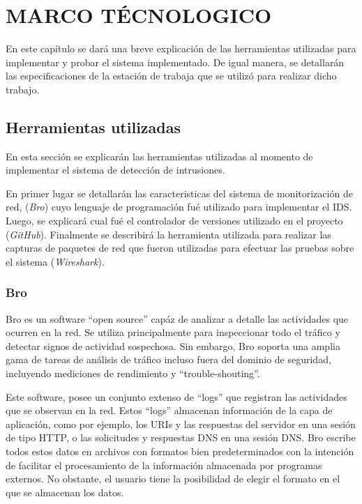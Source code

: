 \chapter{MARCO TÉCNOLOGICO}
\label{capituloTecnologico}

En este capítulo se dará una breve explicación de las herramientas utilizadas para implementar y probar el sistema implementado. De igual manera, se detallarán las especificaciones de la estación de trabaja que se utilizó para realizar dicho trabajo.  

\section{Herramientas utilizadas}

En esta sección se explicarán las herramientas utilizadas al momento de implementar el sistema  de detección de intrusiones.

En primer lugar se detallarán las caracteristicas del sistema de monitorización de red, (\textit{Bro}) cuyo lenguaje de programación fué utilizado para implementar el IDS. Luego, se explicará cual fué el controlador de versiones utilizado en el proyecto (\textit{GitHub}). Finalmente se describirá la herramienta utilizada para realizar las capturas de paquetes de red que fueron utilizadas para efectuar las pruebas sobre el sistema (\textit{Wireshark}).  

\subsection{Bro}\label{ssec:Bro}

Bro es un software ``open source'' capáz de analizar a detalle las actividades que ocurren en la red. Se utiliza principalmente para inspeccionar todo el tráfico y detectar signos de actividad sospechosa. Sin embargo, Bro soporta una amplia gama de tareas de análisis de tráfico incluso fuera del dominio de seguridad, incluyendo mediciones de rendimiento y ``trouble-shouting''.\cite{Bro}

Este software, posee un conjunto extenso de ``logs'' que registran las actividades que se observan en la red. Estos ``logs'' almacenan información de la capa de aplicación, como por ejemplo, los URIs y las respuestas del servidor en una sesión de tipo HTTP, o las solicitudes y respuestas DNS en una sesión DNS. Bro escribe todos estos datos en archivos con formatos bien predeterminados con la intención de facilitar el procesamiento de la información almacenada por programas externos. No obstante, el usuario tiene la posibilidad de elegir el formato en el que se almacenan los datos.

